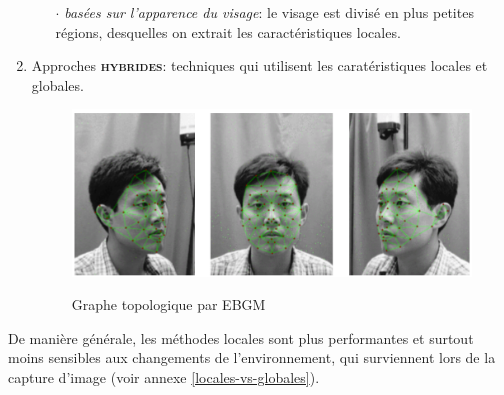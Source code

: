 \begin{enumerate}
\begin{itemize}
	\item[$\cdot$] \textit{basées sur l'apparence du visage}: le visage est divisé en plus petites régions, desquelles on extrait les caractéristiques locales.
	\end{itemize}
\item Approches \textsc{\textbf{hybrides}}: techniques qui utilisent les caratéristiques locales et globales.
	\begin{figure}[h!]
	\center\includegraphics[scale=.3]{images/ebgm}\label{graphe-topo}
	\caption{Graphe topologique par EBGM \cite{Ximage_1}}
	\end{figure}
\end{enumerate}

De manière générale, les méthodes locales sont plus performantes et surtout moins sensibles aux changements de l'environnement, qui surviennent lors de la capture d'image (voir annexe \ref{locales-vs-globales}).



